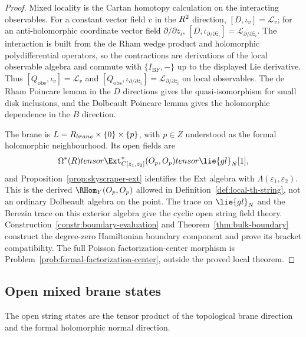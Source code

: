 \documentclass[11pt]{memoir}
\begin{document}
\begin{proof}
  Mixed locality is the Cartan homotopy calculation on the interacting
  observables. For a constant vector
  field $v$ in the $R^2$ direction, $[D,\iota_v]=\mathcal L_v$; for an
  anti-holomorphic coordinate vector field $\partial/\partial\bar z_i$,
  $[D,\iota_{\partial/\partial\bar z_i}]
  =\mathcal L_{\partial/\partial\bar z_i}$. The interaction is built from the
  de Rham wedge product and holomorphic polydifferential operators, so the
  contractions are derivations of the local observable algebra and commute with
  $\{I_{\mathrm{BF}},-\}$ up to the displayed Lie derivative. Thus
  $[Q_{\mathrm{obs}},\iota_v]=\mathcal L_v$ and
  $[Q_{\mathrm{obs}},\iota_{\partial/\partial\bar z_i}]
  =\mathcal L_{\partial/\partial\bar z_i}$ on local observables. The de Rham
  Poincare lemma in the $D$ directions gives the quasi-isomorphism for small
  disk inclusions, and the Dolbeault Poincare lemma gives the holomorphic
  dependence in the $B$ direction.

  The brane is
  \(L=R_{brane}\times\{0\}\times\{p\}\), with \(p\in Z\)
  understood as the formal holomorphic neighbourhood. Its open fields are
  $$\Omega^*(\R)\otimes
    \Ext^*_{\C[z_1,z_2]}(\mc O_p,\mc O_p)\otimes\lie{gl}_N[1],$$
  and Proposition~\ref{prop:skyscraper-ext} identifies the Ext algebra with
  $\Lambda(\varepsilon_1,\varepsilon_2)$. This is the derived
  $\RHom_Y(\mc O_p,\mc O_p)$ allowed in Definition~\ref{def:local-th-string},
  not an ordinary Dolbeault algebra on the point. The trace on $\lie{gl}_N$ and
  the Berezin trace on this exterior algebra give the cyclic open string field
  theory. Construction~\ref{constr:boundary-evaluation} and
  Theorem~\ref{thm:bulk-boundary} construct the degree-zero Hamiltonian
  boundary component and prove its bracket compatibility. The full
  Poisson factorization-center morphism is Problem~\ref{prob:formal-factorization-center},
  outside the proved local theorem.
\end{proof}

\subsection{Open mixed brane states}
  The open string states are the tensor product of the topological brane
  direction and the formal holomorphic normal direction.
\end{document}
